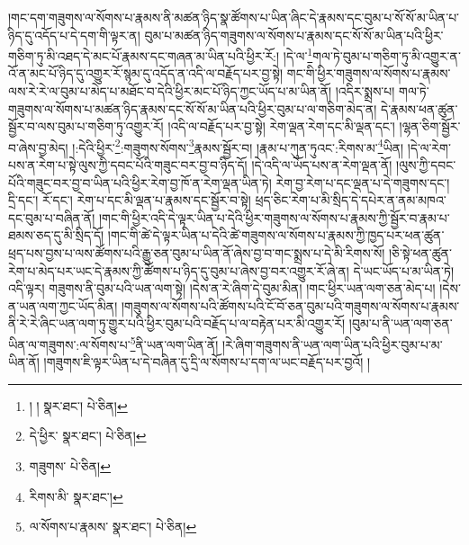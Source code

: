 །གང་དག་གཟུགས་ལ་སོགས་པ་རྣམས་ནི་མཚན་ཉིད་སྣ་ཚོགས་པ་ཡིན་ཞིང་དེ་རྣམས་དང་བུམ་པ་སོ་སོ་མ་ཡིན་པ་ཉིད་དུ་འདོད་པ་དེ་དག་གི་ལྟར་ན། བུམ་པ་མཚན་ཉིད་གཟུགས་ལ་སོགས་པ་རྣམས་དང་སོ་སོ་མ་ཡིན་པའི་ཕྱིར་གཅིག་ཏུ་མི་འཐད་དེ་མང་པོ་རྣམས་དང་གཞན་མ་ཡིན་པའི་ཕྱིར་རོ:། །དེ་ལ་\footnote{། །  སྣར་ཐང་།  པེ་ཅིན། }གལ་ཏེ་བུམ་པ་གཅིག་ཏུ་མི་འགྱུར་ན་འོ་ན་མང་པོ་ཉིད་དུ་འགྱུར་རོ་སྙམ་དུ་འདོད་ན་འདི་ལ་བརྗོད་པར་བྱ་སྟེ། གང་གི་ཕྱིར་གཟུགས་ལ་སོགས་པ་རྣམས་ལས་རེ་རེ་ལ་བུམ་པ་མེད་པ་མཐོང་བ་དེའི་ཕྱིར་མང་པོ་ཉིད་ཀྱང་ཡོད་པ་མ་ཡིན་ནོ། །འདིར་སྨྲས་པ། གལ་ཏེ་གཟུགས་ལ་སོགས་པ་མཚན་ཉིད་རྣམས་དང་སོ་སོ་མ་ཡིན་པའི་ཕྱིར་བུམ་པ་ལ་གཅིག་མེད་ན། དེ་རྣམས་ཕན་ཚུན་སྦྱོར་བ་ལས་བུམ་པ་གཅིག་ཏུ་འགྱུར་རོ། །འདི་ལ་བརྗོད་པར་བྱ་སྟེ། རེག་ལྡན་རེག་དང་མི་ལྡན་དང་། །ལྷན་ཅིག་སྦྱོར་བ་ཞེས་བྱ་མེད། །:དེའི་ཕྱིར་\footnote{དེ་ཕྱིར་  སྣར་ཐང་།  པེ་ཅིན། }:གཟུགས་སོགས་\footnote{གཟུགས་  པེ་ཅིན། }རྣམས་སྦྱོར་བ། །རྣམ་པ་ཀུན་ཏུའང་:རིགས་མ་\footnote{རིགས་མི་  སྣར་ཐང་། }ཡིན། །དེ་ལ་རེག་པས་ན་རེག་པ་སྟེ་ལུས་ཀྱི་དབང་པོའི་གཟུང་བར་བྱ་བ་ཉིད་དོ། །དེ་འདི་ལ་ཡོད་པས་ན་རེག་ལྡན་ནོ། །ལུས་ཀྱི་དབང་པོའི་གཟུང་བར་བྱ་བ་ཡིན་པའི་ཕྱིར་རེག་བྱ་ཁོ་ན་རེག་ལྡན་ཡིན་ཏེ། རེག་བྱ་རེག་པ་དང་ལྡན་པ་དེ་གཟུགས་དང་། དྲི་དང་། རོ་དང་། རེག་པ་དང་མི་ལྡན་པ་རྣམས་དང་སྦྱོར་བ་སྟེ། ཕྲད་ཅིང་རེག་པ་མི་སྲིད་དེ་དཔེར་ན་ནམ་མཁའ་དང་བུམ་པ་བཞིན་ནོ། །གང་གི་ཕྱིར་འདི་དེ་ལྟར་ཡིན་པ་དེའི་ཕྱིར་གཟུགས་ལ་སོགས་པ་རྣམས་ཀྱི་སྦྱོར་བ་རྣམ་པ་ཐམས་ཅད་དུ་མི་སྲིད་དོ། །གང་གི་ཚེ་དེ་ལྟར་ཡིན་པ་དེའི་ཚེ་གཟུགས་ལ་སོགས་པ་རྣམས་ཀྱི་ཁྱད་པར་ཕན་ཚུན་ཕྲད་པས་བྱས་པ་ལས་ཚོགས་པའི་རྒྱུ་ཅན་བུམ་པ་ཡིན་ནོ་ཞེས་བྱ་བ་གང་སྨྲས་པ་དེ་མི་རིགས་སོ། །ཅི་སྟེ་ཕན་ཚུན་རེག་པ་མེད་པར་ཡང་དེ་རྣམས་ཀྱི་ཚོགས་པ་ཉིད་དུ་བུམ་པ་ཞེས་བྱ་བར་འགྱུར་རོ་ཞེ་ན། དེ་ཡང་ཡོད་པ་མ་ཡིན་ཏེ། འདི་ལྟར། གཟུགས་ནི་བུམ་པའི་ཡན་ལག་སྟེ། །དེས་ན་རེ་ཞིག་དེ་བུམ་མིན། །གང་ཕྱིར་ཡན་ལག་ཅན་མེད་པ། །དེས་ན་ཡན་ལག་ཀྱང་ཡོད་མིན། །གཟུགས་ལ་སོགས་པའི་ཚོགས་པའི་ངོ་བོ་ཅན་བུམ་པའི་གཟུགས་ལ་སོགས་པ་རྣམས་ནི་རེ་རེ་ཞིང་ཡན་ལག་ཏུ་གྱུར་པའི་ཕྱིར་བུམ་པའི་བརྗོད་པ་ལ་བརྟེན་པར་མི་འགྱུར་རོ། །བུམ་པ་ནི་ཡན་ལག་ཅན་ཡིན་ལ་གཟུགས་:ལ་སོགས་པ་\footnote{ལ་སོགས་པ་རྣམས་  སྣར་ཐང་།  པེ་ཅིན། }ནི་ཡན་ལག་ཡིན་ནོ། །རེ་ཞིག་གཟུགས་ནི་ཡན་ལག་ཡིན་པའི་ཕྱིར་བུམ་པ་མ་ཡིན་ནོ། །གཟུགས་ཇི་ལྟར་ཡིན་པ་དེ་བཞིན་དུ་དྲི་ལ་སོགས་པ་དག་ལ་ཡང་བརྗོད་པར་བྱའོ། །
